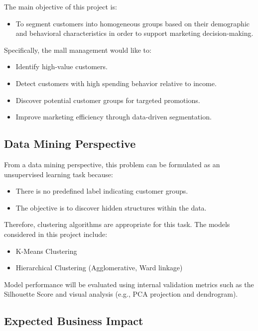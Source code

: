 \documentclass[12pt,a4paper]{article}
\begin{document}
The main objective of this project is:

\begin{itemize}
    \item To segment customers into homogeneous groups based on their demographic and behavioral characteristics in order to support marketing decision-making.
\end{itemize}

Specifically, the mall management would like to:

\begin{itemize}
    \item Identify high-value customers.
    \item Detect customers with high spending behavior relative to income.
    \item Discover potential customer groups for targeted promotions.
    \item Improve marketing efficiency through data-driven segmentation.
\end{itemize}

\subsection{Data Mining Perspective}

From a data mining perspective, this problem can be formulated as an unsupervised learning task because:

\begin{itemize}
    \item There is no predefined label indicating customer groups.
    \item The objective is to discover hidden structures within the data.
\end{itemize}

Therefore, clustering algorithms are appropriate for this task. The models considered in this project include:

\begin{itemize}
    \item K-Means Clustering
    \item Hierarchical Clustering (Agglomerative, Ward linkage)
\end{itemize}

Model performance will be evaluated using internal validation metrics such as the Silhouette Score and visual analysis (e.g., PCA projection and dendrogram).

\subsection{Expected Business Impact}
\end{document}
